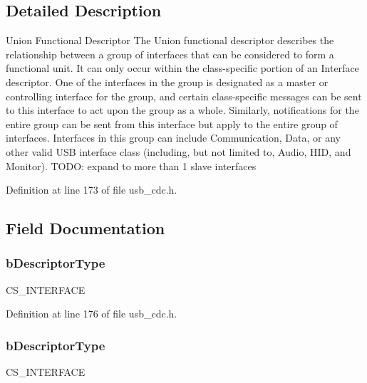 \subsection{Detailed Description}
Union Functional Descriptor The Union functional descriptor describes the relationship between a group of interfaces that can be considered to form a functional unit. It can only occur within the class-\/specific portion of an Interface descriptor. One of the interfaces in the group is designated as a master or controlling interface for the group, and certain class-\/specific messages can be sent to this interface to act upon the group as a whole. Similarly, notifications for the entire group can be sent from this interface but apply to the entire group of interfaces. Interfaces in this group can include Communication, Data, or any other valid U\-S\-B interface class (including, but not limited to, Audio, H\-I\-D, and Monitor). T\-O\-D\-O\-: expand to more than 1 slave interfaces 

Definition at line 173 of file usb\-\_\-cdc.\-h.



\subsection{Field Documentation}
\hypertarget{struct_u_s_b___union___functional___descriptor_af6d6c7e334878414c973fc10e54cfb4e}{
\subsubsection[{b\-Descriptor\-Type}]{ b\-Descriptor\-Type}}\label{struct_u_s_b___union___functional___descriptor_af6d6c7e334878414c973fc10e54cfb4e}
C\-S\-\_\-\-I\-N\-T\-E\-R\-F\-A\-C\-E 

Definition at line 176 of file usb\-\_\-cdc.\-h.

\hypertarget{struct_u_s_b___union___functional___descriptor_a0b4dacbe8b9cc6e176f298a4fe7bbd39}{
\subsubsection[{b\-Descriptor\-Type}]{ b\-Descriptor\-Type}}\label{struct_u_s_b___union___functional___descriptor_a0b4dacbe8b9cc6e176f298a4fe7bbd39}
C\-S\-\_\-\-I\-N\-T\-E\-R\-F\-A\-C\-E 

